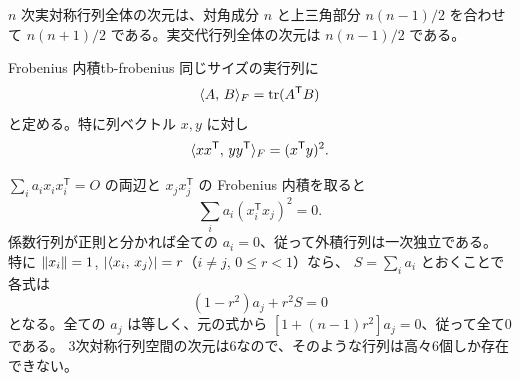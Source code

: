 $n$ 次実対称行列全体の次元は、対角成分 $n$ と上三角部分 $n(n-1)/2$ を合わせて
$n(n+1)/2$ である。実交代行列全体の次元は $n(n-1)/2$ である。

\begin{definition}{Frobenius 内積}{tb-frobenius}
同じサイズの実行列に
\[
\langle A,\, B \rangle_{F}=\operatorname{tr}(A^{\mathsf T}B)
\]
と定める。特に列ベクトル $x,y$ に対し
\[
\langle xx^{\mathsf T},\, yy^{\mathsf T} \rangle_F=(x^{\mathsf T}y)^2.
\]
\end{definition}

$\sum_i a_ix_ix_i^{\mathsf T}=O$ の両辺と $x_jx_j^{\mathsf T}$ の Frobenius 内積を取ると
\[
\sum_i a_i(x_i^{\mathsf T}x_j)^2=0.
\]
係数行列が正則と分かれば全ての $a_i=0$、従って外積行列は一次独立である。
特に $\lVert x_i \rVert=1$, $\lvert \langle x_i,\, x_j \rangle \rvert=r$（$i\ne j$, $0\le r<1$）なら、
$S=\sum_i a_i$ とおくことで各式は
\[
(1-r^2)a_j+r^2S=0
\]
となる。全ての $a_j$ は等しく、元の式から
$[1+(n-1)r^2]a_j=0$、従って全て0である。
3次対称行列空間の次元は6なので、そのような行列は高々6個しか存在できない。
